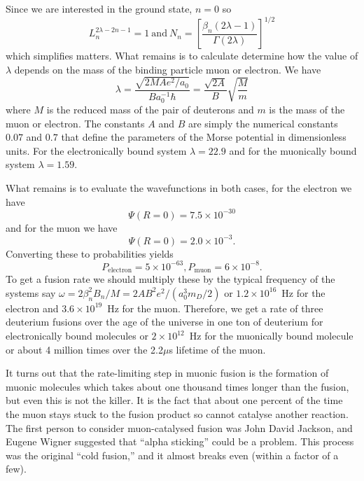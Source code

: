\begin{enumerate}
Since we are interested in the ground state, $n=0$ so
\begin{equation}
L_n^{2\lambda-2n-1} = 1 ~\mathrm{and}~ N_n = \left [ \frac{\beta_n ( 2
    \lambda -1)}{\Gamma(2\lambda)} \right ]^{1/2} 
\end{equation}
which simplifies matters.  What remains is to calculate determine how
the value of $\lambda$ depends on the mass of the binding particle
muon or electron.  We have
\begin{equation}
\lambda = \frac{\sqrt{2 M A e^2/a_0}}{B a_0^{-1} \hbar} =
\frac{\sqrt{2 A}}{B} \sqrt{\frac{M}{m}}
\end{equation}
where $M$ is the reduced mass of the pair of deuterons and $m$ is the
mass of the muon or electron.  The constants $A$ and $B$ are simply
the numerical constants $0.07$ and $0.7$ that define the parameters of
the Morse potential in dimensionless units.  For the electronically bound
system $\lambda=22.9$ and for the muonically bound system
$\lambda=1.59$.

What remains is to evaluate the wavefunctions in both cases, for the
electron we have
\begin{equation}
\Psi(R=0) = 7.5 \times 10^{-30}
\end{equation}
and for the muon we have
\begin{equation}
\Psi(R=0) = 2.0 \times 10^{-3}.
\end{equation}
Converting these to probabilities yields 
\begin{equation}
P_\mathrm{electron} = 5 \times 10^{-63}, P_\mathrm{muon} = 6 \times 10^{-8}.
\end{equation}
To get a fusion rate we should multiply these by the typical frequency
of the systems say $\omega=2\beta_n^2 B_n/M=2 A B^2 e^2/(a_0^3 m_D/2)$
or $1.2 \times 10^{16}$~Hz for the electron and $3.6 \times
10^{19}$~Hz for the muon.  Therefore, we get a rate of three deuterium
fusions over the age of the universe in one ton of deuterium for
electronically bound molecules or $2 \times 10^{12}$~Hz for the
muonically bound molecule or about 4 million times over the 2.2$\mu$s
lifetime of the muon.  

It turns out that the rate-limiting step in muonic fusion is the
formation of muonic molecules which takes about one thousand times
longer than the fusion, but even this is not the killer.  It is the
fact that about one percent of the time the muon stays stuck to the
fusion product so cannot catalyse another reaction.  The first person
to consider muon-catalysed fusion was John David Jackson, and Eugene
Wigner suggested that ``alpha sticking'' could be a problem.  This
process was the original ``cold fusion,'' and it almost breaks even
(within a factor of a few).
\end{enumerate}

